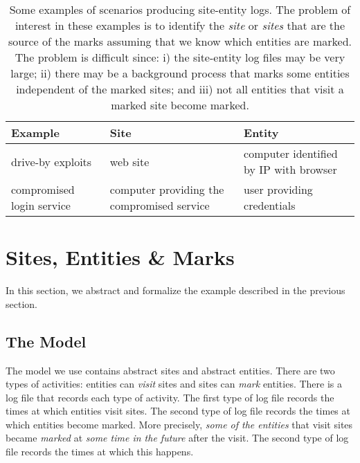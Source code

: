 \documentclass{acm_proc_article-sp}
\begin{document}
\begin{table*}
\begin{center}
\begin{tabular}{|p{1.5in}|p{1.5in}|p{1.5in}|} \hline
{\bf Example} & {\bf Site} & {\bf Entity} \\ \hline

drive-by exploits & web site & computer identified by 
IP with browser \\ \hline

compromised login service & computer providing 
the compromised service & user providing credentials \\ \hline


\end{tabular}
\end{center}
\caption{Some examples of scenarios producing site-entity logs.  The
  problem of interest in these examples is to identify the {\em site} or {\em sites}
  that are the source of the marks assuming that we know which entities
  are marked.  The problem is difficult since: i) the site-entity log files may be
  very large; ii) there may be a background process that marks some entities
  independent of the marked sites; and iii)   not all entities that visit a marked site become marked.}
\label{table:example}
\end{table*}

\section{Sites, Entities \& Marks}
\label{section:spm}

In this section, we abstract and formalize the example described in the previous section.

\vfill\eject
\subsection{The Model}

The model we use contains abstract sites and abstract entities.  There are two types of activities: entities can {\em visit} sites and sites can {\em mark} entities.  There is a log file that records each type of activity.  The first type of log file records the times at which entities visit sites.  The second type of log file records the times at which entities become marked.  More precisely, {\em some of the entities} that visit sites became {\em marked} at {\em some time in the future} after the visit.  The second type of log file records the times at which this happens.
\end{document}
